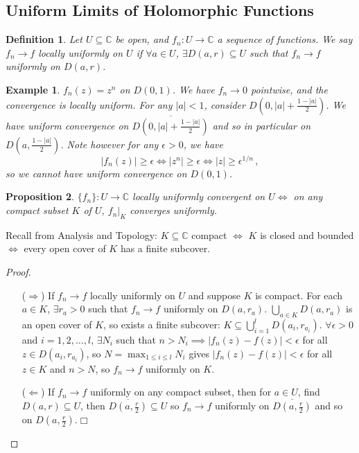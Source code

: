 \documentclass{article}
\theoremstyle{plain}\theoremheaderfont{\normalfont\itshape}\theorembodyfont{\rmfamily}\theoremseparator{.}\newtheorem*{rem}{Remark}\newtheorem*{ex}{Example}\newtheorem*{proof}{Proof}\newtheorem*{altp}{Alternative proof}\newtheorem*{con}{Consequences}\newtheorem*{notn}{Notations}\newtheorem*{cau}{Caution}\newtheorem*{term}{Terminology}\newtheorem*{keyex}{Key example}
\theoremstyle{plain}\theoremheaderfont{\normalfont\bfseries}\theorembodyfont{\rmfamily}\theoremseparator{.}\newtheorem{thm}{Theorem}[section]\newtheorem{lem}[thm]{Lemma}\newtheorem{prop}[thm]{Proposition}\newtheorem*{cor}{Corollary}\newtheorem{defn}[thm]{Definition}\newtheorem{clm}[thm]{Claim}\newtheorem{clminproof}{Claim}\newtheorem{leminproof}{Lemma}\newtheorem{app}{Application}
\theoremstyle{break}\theoremheaderfont{\normalfont\itshape}\theorembodyfont{\rmfamily}\theoremseparator{.\medskip}\newtheorem*{proofskip}{Proof}\newtheorem*{exs}{Examples}\newtheorem*{rems}{Remarks}\newtheorem*{rec}{Recall}\newtheorem*{ppts}{Properties}
\theoremstyle{break}\theoremheaderfont{\normalfont\bfseries}\theorembodyfont{\rmfamily}\theoremseparator{.\medskip}\newtheorem{lemskip}[thm]{Lemma}\newtheorem{defnskip}[thm]{Definition}\newtheorem{propskip}[thm]{Proposition}\newtheorem{thmskip}[thm]{Theorem}
\numberwithin{equation}{section}
\newcommand{\qed}{\hfill\ensuremath{\Box}}
\newcommand{\abs}[1]{\left|#1\right|}
\newcommand{\CC}{\mathbb{C}}
\begin{document}
    \subsection{Uniform Limits of Holomorphic Functions}
    \begin{defn}
        Let \(U\subseteq\CC\) be open, and \(f_n:U\to\CC\) a sequence of functions. We say \(f_n\to f\) \textit{locally uniformly} on \(U\) if \(\forall a\in U\), \(\exists D(a,r)\subseteq U\) such that \(f_n\to f\) uniformly on \(D(a,r)\).
    \end{defn}
    \begin{ex}
        \(f_n(z)=z^n\) on \(D(0,1)\). We have \(f_n\to 0\) pointwise, and the convergence is locally uniform. For any \(\abs{a}<1\), consider \(D(0,\abs{a}+\frac{1-\abs{a}}{2})\). We have uniform convergence on \(\overline{D(0,\abs{a}+\frac{1-\abs{a}}{2})}\) and so in particular on \(D(a,\frac{1-\abs{a}}{2})\). Note however for any \(\epsilon>0\), we have
        \[\abs{f_n(z)}\ge\epsilon\iff\abs{z^n}\ge\epsilon\iff\abs{z}\ge\epsilon^{1/n}\,,\]
        so we cannot have uniform convergence on \(D(0,1)\).
    \end{ex}
    \begin{prop}
        \(\{f_n\}:U\to\CC\) locally uniformly convergent on \(U\iff\) on any compact subset \(K\) of \(U\), \(f_n|_{K}\) converges uniformly.
    \end{prop}
    Recall from Analysis and Topology: \(K\subseteq\CC\) compact \(\iff\) \(K\) is closed and bounded \(\iff\) every open cover of \(K\) has a finite subcover.
    \begin{proof}
        \begin{itemize}
			\item[(\(\Rightarrow\))] If \(f_n\to f\) locally uniformly on \(U\) and suppose \(K\) is compact. For each \(a\in K\), \(\exists r_a>0\) such that \(f_n\to f\) uniformly on \(D(a,r_a)\). \(\bigcup_{a\in K}D(a,r_a)\) is an open cover of \(K\), so exists a finite subcover: \(K\subseteq \bigcup_{i=1}^{l} D(a_i,r_{a_i})\). \(\forall\epsilon>0\) and \(i=1,2,\dots,l\), \(\exists N_i\) such that \(n>N_i\implies\abs{f_n(z)-f(z)}<\epsilon\) for all \(z\in D(a_i,r_{a_i})\), so \(N=\max_{1\le i\le l}N_i\) gives \(\abs{f_n(z)-f(z)}<\epsilon\) for all \(z\in K\) and \(n>N\), so \(f_n\to f\) uniformly on \(K\). 
			\item[(\(\Leftarrow\))] If \(f_n\to f\) uniformly on any compact subset, then for \(a\in U\), find \(D(a,r)\subseteq U\), then \(\overline{D(a,\frac{r}{2})}\subseteq U\) so \(f_n\to f\) uniformly on \(\overline{D(a,\frac{r}{2})}\) and so on \(D(a,\frac{r}{2})\).\qed
		\end{itemize}
    \end{proof}\
\end{document}
